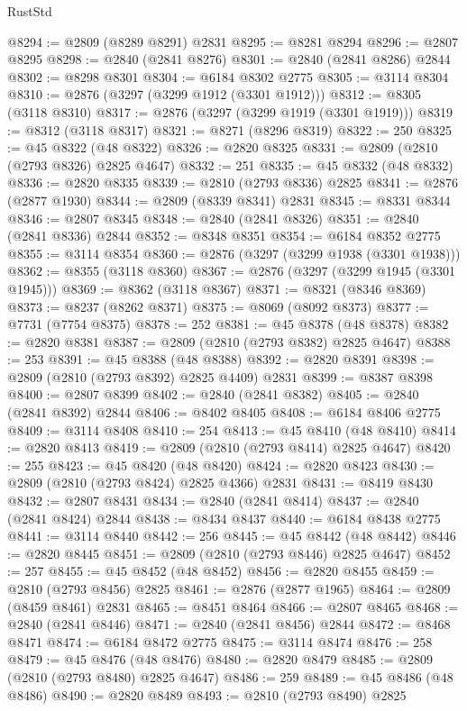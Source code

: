\begin{lexlean}{RustStd}
\begin{coremodule}
@8294 := @2809 (@8289 @8291) @2831
@8295 := @8281 @8294
@8296 := @2807 @8295
@8298 := @2840 (@2841 @8276)
@8301 := @2840 (@2841 @8286) @2844
@8302 := @8298 @8301
@8304 := @6184 @8302 @2775
@8305 := @3114 @8304
@8310 := @2876 (@3297 (@3299 @1912 (@3301 @1912)))
@8312 := @8305 (@3118 @8310)
@8317 := @2876 (@3297 (@3299 @1919 (@3301 @1919)))
@8319 := @8312 (@3118 @8317)
@8321 := @8271 (@8296 @8319)
@8322 := 250
@8325 := @45 @8322 (@48 @8322)
@8326 := @2820 @8325
@8331 := @2809 (@2810 (@2793 @8326) @2825 @4647)
@8332 := 251
@8335 := @45 @8332 (@48 @8332)
@8336 := @2820 @8335
@8339 := @2810 (@2793 @8336) @2825
@8341 := @2876 (@2877 @1930)
@8344 := @2809 (@8339 @8341) @2831
@8345 := @8331 @8344
@8346 := @2807 @8345
@8348 := @2840 (@2841 @8326)
@8351 := @2840 (@2841 @8336) @2844
@8352 := @8348 @8351
@8354 := @6184 @8352 @2775
@8355 := @3114 @8354
@8360 := @2876 (@3297 (@3299 @1938 (@3301 @1938)))
@8362 := @8355 (@3118 @8360)
@8367 := @2876 (@3297 (@3299 @1945 (@3301 @1945)))
@8369 := @8362 (@3118 @8367)
@8371 := @8321 (@8346 @8369)
@8373 := @8237 (@8262 @8371)
@8375 := @8069 (@8092 @8373)
@8377 := @7731 (@7754 @8375)
@8378 := 252
@8381 := @45 @8378 (@48 @8378)
@8382 := @2820 @8381
@8387 := @2809 (@2810 (@2793 @8382) @2825 @4647)
@8388 := 253
@8391 := @45 @8388 (@48 @8388)
@8392 := @2820 @8391
@8398 := @2809 (@2810 (@2793 @8392) @2825 @4409) @2831
@8399 := @8387 @8398
@8400 := @2807 @8399
@8402 := @2840 (@2841 @8382)
@8405 := @2840 (@2841 @8392) @2844
@8406 := @8402 @8405
@8408 := @6184 @8406 @2775
@8409 := @3114 @8408
@8410 := 254
@8413 := @45 @8410 (@48 @8410)
@8414 := @2820 @8413
@8419 := @2809 (@2810 (@2793 @8414) @2825 @4647)
@8420 := 255
@8423 := @45 @8420 (@48 @8420)
@8424 := @2820 @8423
@8430 := @2809 (@2810 (@2793 @8424) @2825 @4366) @2831
@8431 := @8419 @8430
@8432 := @2807 @8431
@8434 := @2840 (@2841 @8414)
@8437 := @2840 (@2841 @8424) @2844
@8438 := @8434 @8437
@8440 := @6184 @8438 @2775
@8441 := @3114 @8440
@8442 := 256
@8445 := @45 @8442 (@48 @8442)
@8446 := @2820 @8445
@8451 := @2809 (@2810 (@2793 @8446) @2825 @4647)
@8452 := 257
@8455 := @45 @8452 (@48 @8452)
@8456 := @2820 @8455
@8459 := @2810 (@2793 @8456) @2825
@8461 := @2876 (@2877 @1965)
@8464 := @2809 (@8459 @8461) @2831
@8465 := @8451 @8464
@8466 := @2807 @8465
@8468 := @2840 (@2841 @8446)
@8471 := @2840 (@2841 @8456) @2844
@8472 := @8468 @8471
@8474 := @6184 @8472 @2775
@8475 := @3114 @8474
@8476 := 258
@8479 := @45 @8476 (@48 @8476)
@8480 := @2820 @8479
@8485 := @2809 (@2810 (@2793 @8480) @2825 @4647)
@8486 := 259
@8489 := @45 @8486 (@48 @8486)
@8490 := @2820 @8489
@8493 := @2810 (@2793 @8490) @2825

\end{coremodule}
\end{lexlean}
